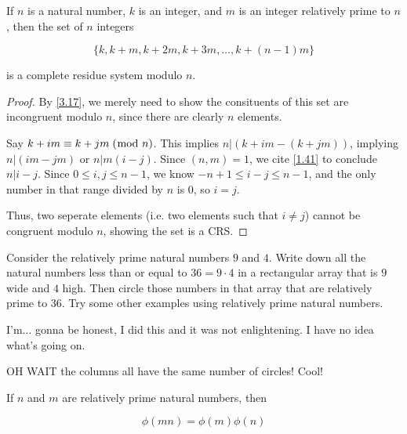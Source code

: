 \documentclass[../main.tex]{subfiles}
\begin{document}
\begin{thm} \label{6.21}
  If $n$ is a natural number, $k$ is an integer, and $m$ is an integer relatively prime to $n$, then the set of $n$ integers

  $$\{k, k+m, k+2m, k+3m, \ldots, k + (n-1)m\}$$

  is a complete residue system modulo $n$.
\end{thm}

\begin{proof}
  By \ref{3.17}, we merely need to show the consituents of this set are incongruent modulo $n$, since there are clearly $n$ elements.

  Say $k + im \equiv k + jm \; (\bmod \; n)$. This implies $n | (k+im - (k+jm))$, implying $n | (im - jm)$ or $n | m(i-j)$. Since $(n, m) = 1$, we cite \ref{1.41} to conclude $n | i-j$. Since $0 \leq i, j \leq n-1$, we know $-n+1 \leq i-j \leq n-1$, and the only number in that range divided by $n$ is $0$, so $i = j$.

  Thus, two seperate elements (i.e. two elements such that $i \neq j$) cannot be congruent modulo $n$, showing the set is a CRS.
\end{proof}



\begin{ex} \label{6.22}
  Consider the relatively prime natural numbers $9$ and $4$. Write down all the natural numbers less than or equal to $36 = 9 \cdot 4$ in a rectangular array that is $9$ wide and $4$ high. Then circle those numbers in that array that are relatively prime to $36$. Try some other examples using relatively prime natural numbers.
\end{ex}

I'm... gonna be honest, I did this and it was not enlightening. I have no idea what's going on.

OH WAIT the columns all have the same number of circles! Cool!



\begin{thm} \label{6.23}
  If $n$ and $m$ are relatively prime natural numbers, then

  $$\phi(mn) = \phi(m)\phi(n)$$
\end{thm}
\end{document}
